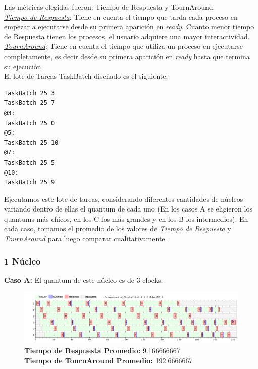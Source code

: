\documentclass[a4paper]{article}
\begin{document}
Las m\'etricas elegidas fueron: Tiempo de Respuesta y TournAround.\\


\underline{\emph{Tiempo de Respuesta}}: Tiene en cuenta el tiempo que tarda cada proceso en empezar a ejecutarse desde su primera aparici\'on en \textit{ready}. Cuanto menor tiempo de Respuesta tienen los procesos, el usuario adquiere una mayor interactividad.\\

\underline{\emph{TournAround}}: Tiene en cuenta el tiempo que utiliza un proceso en ejecutarse completamente, es decir desde su primera aparici\'on en \textit{ready} hasta que termina su ejecuci\'on.\\



El lote de Tareas TaskBatch dise\~nado es el siguiente:
	\begin{codesnippet}
	\begin{verbatim}
TaskBatch 25 3
TaskBatch 25 7
@3:
TaskBatch 25 0
@5:
TaskBatch 25 10
@7:
TaskBatch 25 5
@10:
TaskBatch 25 9
	\end{verbatim}
	\end{codesnippet}
\newpage	
	Ejecutamos este lote de tareas, considerando diferentes cantidades de n\'ucleos variando dentro de ellas el quantum de cada uno (En los casos A se eligieron los quantums m\'as chicos, en los C los m\'as grandes y en los B los intermedios). En cada caso, tomamos el promedio de los valores de \textit{Tiempo de Respuesta} y \textit{TournAround} para luego comparar cualitativamente.
	
	\subsubsection*{1 N\'ucleo}
	
	\textbf{Caso A:} El quantum de este n\'ucleo es de 3 clocks.
	
	 \begin{figure}[h!]
   \begin{center}
 	\includegraphics[scale=0.5]{imagenes/ej7/1nucleoA.png}
 	\textbf{Tiempo de Respuesta Promedio:} 9.166666667\\
 	\textbf{Tiempo de TournAround Promedio:} 192.6666667\\
   \end{center}
 \end{figure} 
	
\end{document}
